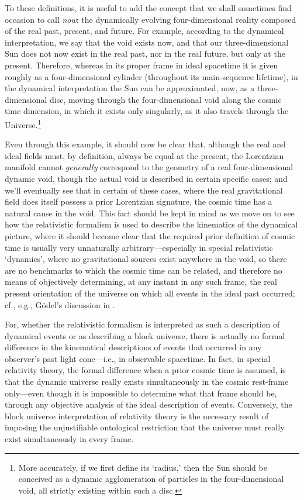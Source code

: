 To these definitions, it is useful to add the concept that we shall sometimes find occasion to call \textit{now}: the dynamically evolving four-dimensional reality composed of the real past, present, and future. For example, according to the dynamical interpretation, we say that the void exists now, and that our three-dimensional Sun does not now exist in the real past, nor in the real future, but only at the present. Therefore, whereas in its proper frame in ideal spacetime it is given roughly as a four-dimensional cylinder (throughout its main-sequence lifetime), in the dynamical interpretation the Sun can be approximated, now, as a three-dimensional disc, moving through the four-dimensional void along the cosmic time dimension, in which it exists only singularly, as it also travels through the Universe.\footnote{More accurately, if we first define its `radius,' then the Sun should be conceived as a dynamic agglomeration of particles in the four-dimensional void, all strictly existing within such a disc.}

Even through this example, it should now be clear that, although the real and ideal fields must, by definition, always be equal at the present, the Lorentzian manifold cannot \textit{generally} correspond to the geometry of a real four-dimensional dynamic void, though the actual void is described in certain specific cases; and we'll eventually see that in certain of these cases, where the real gravitational field does itself possess a prior Lorentzian signature, the cosmic time has a natural cause in the void. This fact should be kept in mind as we move on to see how the relativistic formalism is used to describe the kinematics of the dynamical picture, where it should become clear that the required prior definition of cosmic time is usually very unnaturally arbitrary---especially in special relativistic `dynamics', where no gravitational sources exist anywhere in the void, so there are no benchmarks to which the cosmic time can be related, and therefore no means of objectively determining, at any instant in any such frame, the real present orientation of the universe on which all events in the ideal past occurred; cf., e.g., G\"{o}del's discussion in \cite{Einstein1951}.

For, whether the relativistic formalism is interpreted as such a description of dynamical events or as describing a block universe, there is actually no formal difference in the kinematical descriptions of events that occurred in any observer's past light cone---i.e., in observable spacetime. In fact, in special relativity theory, the formal difference when a prior cosmic time is assumed, is that the dynamic universe really exists simultaneously in the cosmic rest-frame only---even though it is impossible to determine what that frame should be, through any objective analysis of the ideal description of events. Conversely, the block universe interpretation of relativity theory is the necessary result of imposing the unjustifiable ontological restriction that the universe must really exist simultaneously in every frame.

